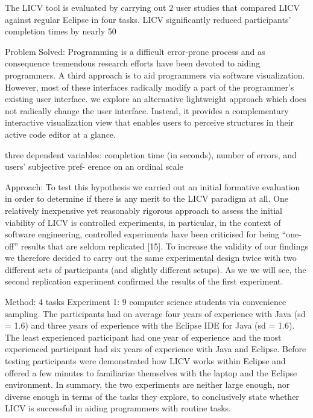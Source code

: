 The LICV tool is evaluated by carrying out 2 user studies that compared LICV against regular Eclipse in four tasks. LICV significantly reduced participants’ completion times by nearly 50%
 
Problem Solved:  Programming is a difficult error-prone process and as consequence tremendous research efforts have been devoted to aiding programmers. A third approach is to aid programmers via software visualization. However, most of these interfaces radically modify a part of the programmer’s existing user interface. we explore an alternative lightweight approach which does not radically change the user interface. Instead, it provides a complementary interactive visualization view that enables users to perceive structures in their active code editor at a glance.

		 	 	 		
			
				
					
three dependent variables: completion time (in seconds), number of errors, and users’ subjective pref- erence on an ordinal scale 
				
			
		

Approach:
To test this hypothesis we carried out an initial formative evaluation in order to determine if there is any merit to the LICV paradigm at all. One relatively inexpensive yet reasonably rigorous approach to assess the initial viability of LICV is controlled experiments, in particular, in the context of software engineering, controlled experiments have been criticised for being “one-off” results that are seldom replicated [15]. To increase the validity of our findings we therefore decided to carry out the same experimental design twice with two different sets of participants (and slightly different setups). As we we will see, the second replication experiment confirmed the results of the first experiment.

Method:
4 tasks
Experiment 1: 
9 computer science students via convenience sampling. The participants had on average four years of experience with Java (sd = 1.6) and three years of experience with the Eclipse IDE for Java (sd = 1.6). The least experienced participant had one year of experience and the most experienced participant had six years of experience with Java and Eclipse.
Before testing participants were demonstrated how LICV works within Eclipse and offered a few minutes to familiarize themselves with the laptop and the Eclipse environment.
In summary, the two experiments are neither large enough, nor diverse enough in terms of the tasks they explore, to conclusively state whether LICV is successful in aiding programmers with routine tasks.

